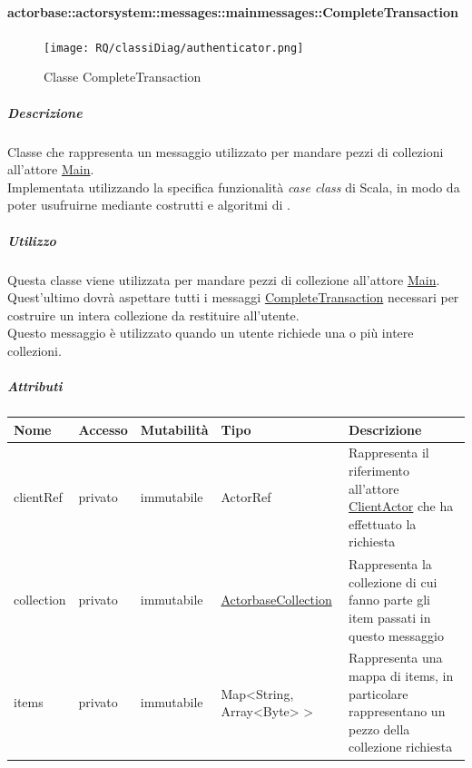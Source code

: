 \documentclass{scalatekids-article}
\begin{document}
\paragraph{actorbase::actorsystem::messages::mainmessages::CompleteTransaction}
\label{sec:actorbase::actorsystem::messages::mainmessages::CompleteTransaction}

\begin{figure}[H]
  \begin{center}
    \texttt{[image: RQ/classiDiag/authenticator.png]}
    \caption{Classe CompleteTransaction}
  \end{center}
\end{figure}

\subparagraph{Descrizione}
Classe che rappresenta un messaggio utilizzato per mandare pezzi di collezioni
all'attore \hyperref[sec:actorbase::actorsystem::actors::main::Main]{Main}.\\Implementata utilizzando la specifica funzionalità \textit{case class} di Scala,
in modo da poter usufruirne mediante costrutti e algoritmi di
.

\subparagraph{Utilizzo}
Questa classe viene utilizzata per mandare pezzi di collezione all'attore
\hyperref[sec:actorbase::actorsystem::actors::main::Main]{Main}.\\Quest'ultimo
dovrà aspettare tutti i messaggi \hyperref[sec:actorbase::actorsystem::messages::mainmessages::CompleteTransaction]{CompleteTransaction} necessari per costruire un intera collezione da restituire all'utente.\\Questo messaggio è utilizzato quando un utente richiede una o più intere collezioni.

\subparagraph{Attributi}
\begin{tabular}{| p{2cm} | p{1.5cm} | p{2cm} | p{3cm} | p{8.5cm} |}
  \hline
  Nome & Accesso & Mutabilità & Tipo & Descrizione\\
  \hline
  clientRef & privato & immutabile & ActorRef & Rappresenta il riferimento all'attore \hyperref[sec:actorbase::actorsystem::actors::clientactor::ClientActor]{ClientActor} che
  ha effettuato la richiesta\\
  \hline
  collection & privato & immutabile & \hyperref[sec:actorbase::actorsystem::utils::ActorbaseCollection]{ActorbaseCollection} & Rappresenta la collezione di cui fanno parte gli item passati in questo messaggio\\
  \hline
  items & privato & immutabile & Map<String, Array<Byte> > & Rappresenta una mappa di items, in particolare rappresentano un pezzo della collezione richiesta\\
  \hline
\end{tabular}
\end{document}
